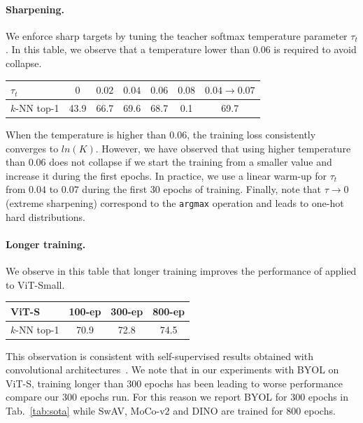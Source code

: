 \paragraph{Sharpening.}
We enforce sharp targets by tuning the teacher softmax temperature parameter $\tau_t$.
In this table, we observe that a temperature lower than $0.06$ is required to avoid collapse.
\begin{table}[h!]
\vspace{-0.8em}
  \centering
  \setlength{\tabcolsep}{4pt}
  \begin{tabular}{@{}l c c c c c c@{}}
	  $\tau_t$ & $0$ & $0.02$ & $0.04$ & $0.06$ & $0.08$ & $0.04 \rightarrow 0.07$ \\
    \midrule
	  $k$-NN top-1 & 43.9 & 66.7 & 69.6 & 68.7 & 0.1 & \colorbox{Light}{69.7} \\
  \end{tabular}
\vspace{-0.8em}
\end{table}
When the temperature is higher than $0.06$, the training loss consistently converges to $ln(K)$.
However, we have observed that using higher temperature than $0.06$ does not collapse if we start the training from a smaller value and increase it during the first epochs.
In practice, we use a linear warm-up for $\tau_t$ from $0.04$ to $0.07$ during the first $30$ epochs of training.
Finally, note that $\tau \rightarrow 0$ (extreme sharpening) correspond to the \texttt{argmax} operation and leads to one-hot hard distributions.

\paragraph{Longer training.}
We observe in this table that longer training improves the performance of \OURS applied to ViT-Small.
\vspace{-0.8em}
\begin{table}[h!]
  \centering
\begin{tabular}{@{}l c c c@{}}
	\OURS ViT-S & 100-ep & 300-ep & 800-ep \\
\midrule
	$k$-NN top-1 & 70.9 & 72.8 & \colorbox{Light}{74.5} \\
\end{tabular}
\vspace{-0.8em}
\end{table}
This observation is consistent with self-supervised results obtained with convolutional architectures~\cite{chen2020simple}.
We note that in our experiments with BYOL on ViT-S, training longer than $300$ epochs has been leading to worse performance compare our $300$ epochs run.
For this reason we report BYOL for 300 epochs in Tab.~\ref{tab:sota} while SwAV, MoCo-v2 and DINO are trained for 800 epochs.

